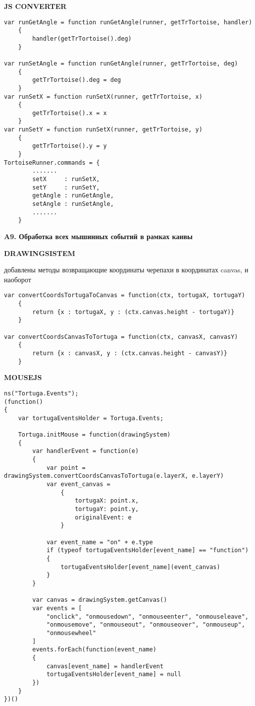 \textbf{JS CONVERTER}
\begin{verbatim}
var runGetAngle = function runGetAngle(runner, getTrTortoise, handler)
    {
        handler(getTrTortoise().deg)
    }

var runSetAngle = function runGetAngle(runner, getTrTortoise, deg)
    {
        getTrTortoise().deg = deg
    }
var runSetX = function runSetX(runner, getTrTortoise, x)
    {
        getTrTortoise().x = x
    }
var runSetY = function runSetX(runner, getTrTortoise, y)
    {
        getTrTortoise().y = y
    }
TortoiseRunner.commands = {
        .......
        setX     : runSetX,
        setY     : runSetY,
        getAngle : runGetAngle,
        setAngle : runSetAngle,
        .......
    }
\end{verbatim}





\vspace{16mm}
\textbf{\Large A9. Обработка всех мышинных событий в рамках канвы}
\vspace{6mm}

\textbf{DRAWINGSISTEM}

добавлены методы возвращающие координаты черепахи в координатах canvas, и наоборот
\begin{verbatim}
var convertCoordsTortugaToCanvas = function(ctx, tortugaX, tortugaY)
    {
        return {x : tortugaX, y : (ctx.canvas.height - tortugaY)}
    }

var convertCoordsCanvasToTortuga = function(ctx, canvasX, canvasY)
    {
        return {x : canvasX, y : (ctx.canvas.height - canvasY)}
    }
\end{verbatim}

\textbf{MOUSEJS}
\begin{verbatim}
ns("Tortuga.Events");
(function()
{
    var tortugaEventsHolder = Tortuga.Events;

    Tortuga.initMouse = function(drawingSystem) 
    {
        var handlerEvent = function(e)
        {
            var point = drawingSystem.convertCoordsCanvasToTortuga(e.layerX, e.layerY)
            var event_canvas = 
                {
                    tortugaX: point.x,
                    tortugaY: point.y,
                    originalEvent: e
                }

            var event_name = "on" + e.type
            if (typeof tortugaEventsHolder[event_name] == "function")
            {
                tortugaEventsHolder[event_name](event_canvas)
            }
        }

        var canvas = drawingSystem.getCanvas()
        var events = [
            "onclick", "onmousedown", "onmouseenter", "onmouseleave",
            "onmousemove", "onmouseout", "onmouseover", "onmouseup",
            "onmousewheel"
        ]
        events.forEach(function(event_name)
        {
            canvas[event_name] = handlerEvent
            tortugaEventsHolder[event_name] = null
        })
    }
})()



\end{verbatim}


